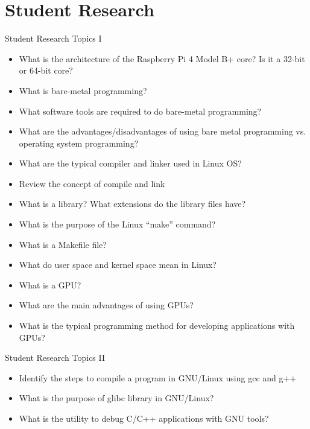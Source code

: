\section{Student Research}
\begin{frame}{Student Research Topics I}
 \begin{itemize}
    \item What is the architecture of the Raspberry Pi 4 Model B+ core? Is it a 32-bit or 64-bit core?
    \item What is bare-metal programming?
    \item What software tools are required to do bare-metal programming?
    \item What are the advantages/disadvantages of using bare metal programming vs. operating system programming?
    \item What are the typical compiler and linker used in Linux OS?
    \item Review the concept of compile and link
    \item What is a library? What extensions do the library files have?
    \item What is the purpose of the Linux “make” command?
    \item What is a Makefile file?
    \item What do user space and kernel space mean in Linux?
    \item What is a GPU?
    \item What are the main advantages of using GPUs?
    \item What is the typical programming method for developing applications with GPUs?
\end{itemize}
\end{frame}


\begin{frame}{Student Research Topics II}
 \begin{itemize}
    \item Identify the steps to compile a program in GNU/Linux using gcc and g++
    \item What is the purpose of glibc library in GNU/Linux?
    \item What is the utility to debug C/C++ applications with GNU tools? 
\end{itemize}
\end{frame}